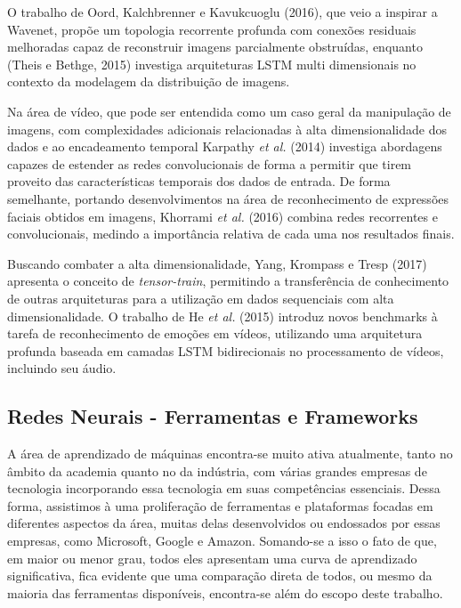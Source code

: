 \documentclass[]{article}
\begin{document}
O trabalho de Oord, Kalchbrenner e Kavukcuoglu (2016), que veio a
inspirar a Wavenet, propõe um topologia recorrente profunda com conexões
residuais melhoradas capaz de reconstruir imagens parcialmente
obstruídas, enquanto (Theis e Bethge, 2015) investiga arquiteturas LSTM
multi dimensionais no contexto da modelagem da distribuição de imagens.

Na área de vídeo, que pode ser entendida como um caso geral da
manipulação de imagens, com complexidades adicionais relacionadas à alta
dimensionalidade dos dados e ao encadeamento temporal Karpathy \emph{et
al.} (2014) investiga abordagens capazes de estender as redes
convolucionais de forma a permitir que tirem proveito das
características temporais dos dados de entrada. De forma semelhante,
portando desenvolvimentos na área de reconhecimento de expressões
faciais obtidos em imagens, Khorrami \emph{et al.} (2016) combina redes
recorrentes e convolucionais, medindo a importância relativa de cada uma
nos resultados finais.

Buscando combater a alta dimensionalidade, Yang, Krompass e Tresp (2017)
apresenta o conceito de \emph{tensor-train}, permitindo a transferência
de conhecimento de outras arquiteturas para a utilização em dados
sequenciais com alta dimensionalidade. O trabalho de He \emph{et al.}
(2015) introduz novos benchmarks à tarefa de reconhecimento de emoções
em vídeos, utilizando uma arquitetura profunda baseada em camadas LSTM
bidirecionais no processamento de vídeos, incluindo seu áudio.

\hypertarget{redes-neurais---ferramentas-e-frameworks}{%
\subsection{Redes Neurais - Ferramentas e
Frameworks}\label{redes-neurais---ferramentas-e-frameworks}}

A área de aprendizado de máquinas encontra-se muito ativa atualmente,
tanto no âmbito da academia quanto no da indústria, com várias grandes
empresas de tecnologia incorporando essa tecnologia em suas competências
essenciais. Dessa forma, assistimos à uma proliferação de ferramentas e
plataformas focadas em diferentes aspectos da área, muitas delas
desenvolvidos ou endossados por essas empresas, como Microsoft, Google e
Amazon. Somando-se a isso o fato de que, em maior ou menor grau, todos
eles apresentam uma curva de aprendizado significativa, fica evidente
que uma comparação direta de todos, ou mesmo da maioria das ferramentas
disponíveis, encontra-se além do escopo deste trabalho.
\end{document}
